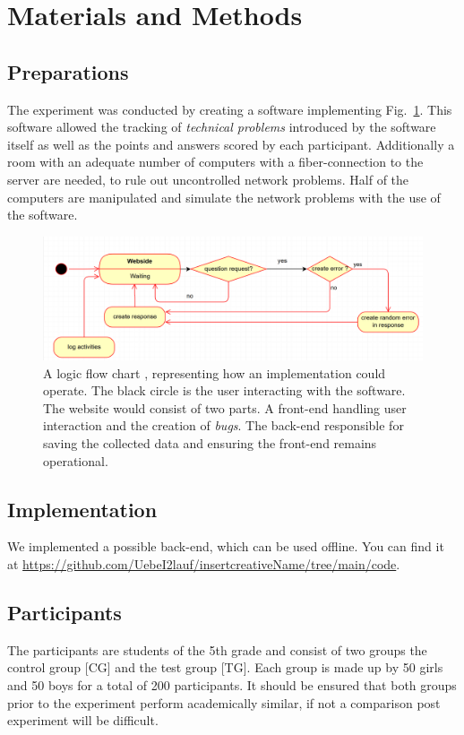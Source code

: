 \documentclass[12pt, a4paper]{article}
\begin{document}
\section{Materials and Methods}
\subsection*{Preparations}
The experiment was conducted by creating a software implementing Fig.~\ref{fig1}.
This software allowed the tracking of {\itshape technical problems} introduced by
the software itself as well as the points and answers scored by each participant.
Additionally a room with an adequate number of computers with a fiber-connection
to the server are needed, to rule out uncontrolled network problems.
Half of the computers are manipulated and simulate the network problems with the
use of the software.

\begin{figure}[h]
    \includegraphics[width=\textwidth]{UML Prototyp.PNG}
    \caption{A logic flow chart , representing how an implementation could operate.
    The black circle is the user interacting with the software. The website would
    consist of two parts. A front-end handling user interaction and the creation of {\itshape bugs}.
    The back-end responsible for saving the collected data and ensuring the front-end
    remains operational.} \label{fig1}
\end{figure}

\subsection*{Implementation}
We implemented a possible back-end, which can be used offline. You can find it 
at \url{https://github.com/UebeI2lauf/insertcreativeName/tree/main/code}.
\subsection*{Participants}
The participants are students of the 5th grade and consist of two groups the control group [CG] and
the test group [TG]. Each group is made up by 50 girls and 50 boys for a total of 200 participants.
It should be ensured that both groups prior to the experiment perform academically similar, if not a
comparison post experiment will be difficult.
\newpage
\end{document}
